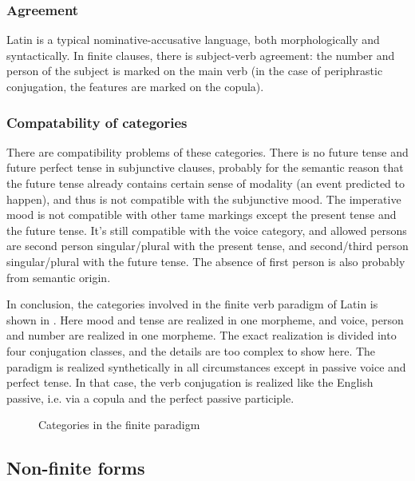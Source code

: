 \documentclass[UTF8, a4paper, oneside]{report}
\begin{document}
\subsubsection{Agreement}

Latin is a typical nominative-accusative language,
both morphologically and syntactically.
In finite clauses, 
there is subject-verb agreement:
the number and person of the subject is marked on the main verb
(in the case of periphrastic conjugation,
the features are marked on the copula).

\subsubsection{Compatability of categories}

There are compatibility problems of these categories.
There is no \acl{future} tense and \acl{future perfect} tense in subjunctive clauses,
probably for the semantic reason
that the future tense already contains certain sense of modality
(an event predicted to happen),
and thus is not compatible with the \acl{subjunctive} mood.
The \acl{imperative} mood is not compatible with other \ac{tame} markings
except the \acl{present} tense and the \acl{future} tense.
It's still compatible with the voice category,
and allowed persons are 
second person singular/plural with the \acl{present} tense,
and second/third person singular/plural with the \acl{future} tense.
The absence of first person is also probably from semantic origin.

In conclusion, the categories involved in the finite verb paradigm of Latin 
is shown in .
Here mood and tense are realized in one morpheme,
and voice, person and number are realized in one morpheme.
The exact realization is divided into four conjugation classes,
and the details are too complex to show here.
The paradigm is realized synthetically in all circumstances 
except in passive voice and perfect tense.
In that case, the verb conjugation is realized like the English passive,
i.e. via a copula and the perfect passive participle.

\begin{figure}[H]
    \centering
    
    \caption{Categories in the finite paradigm}
    \label{fig:paradigm-finite-verb}
\end{figure}

\subsection{Non-finite forms}
\end{document}
